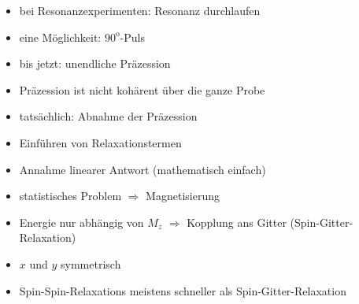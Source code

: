 \documentclass[
	a4paper,%
	twoside,%
	index=totoc,
	parskip=half,
 	chapterprefix,%
	headsepline,%
	13pt,%
	BCOR5mm,%
	fleqn,%
  openany,%
  ngerman
]{scrbook}
\begin{document}
\begin{itemize}
\item bei Resonanzexperimenten: Resonanz durchlaufen
\item eine Möglichkeit: $90^\mathrm{o}$-Puls
\item bis jetzt: unendliche Präzession
\item Präzession ist nicht kohärent über die ganze Probe
\item tatsächlich: Abnahme der Präzession
\item Einführen von Relaxationstermen
\item Annahme linearer Antwort (mathematisch einfach)
\item statistisches Problem $\Rightarrow$ Magnetisierung
\item Energie nur abhängig von $M_z$ $\Rightarrow$ Kopplung ans Gitter (Spin-Gitter-Relaxation)
\item $x$ und $y$ symmetrisch
\item Spin-Spin-Relaxations meistens schneller als Spin-Gitter-Relaxation
\end{itemize}
\end{document}
